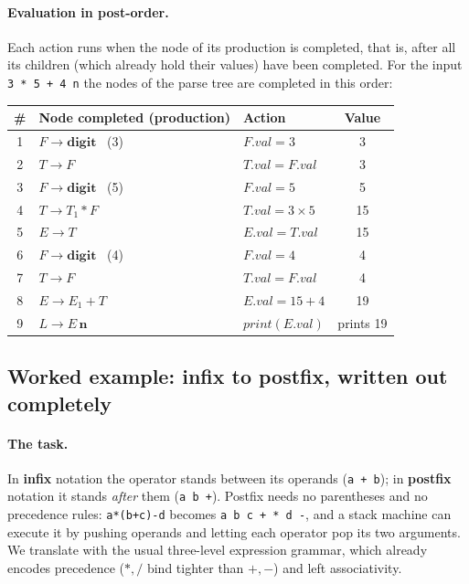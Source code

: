 \documentclass[11pt,a4paper]{article}
\begin{document}
\paragraph{Evaluation in post-order.} Each action runs when the node of its production is completed, that is, after all its children (which already hold their values) have been completed. For the input \texttt{3 * 5 + 4 n} the nodes of the parse tree are completed in this order:
\begin{center}
\small
\begin{tabular}{@{}c l l c@{}}
\toprule
\textbf{\#} & \textbf{Node completed (production)} & \textbf{Action} & \textbf{Value} \\ \midrule
1 & $F\to\mathbf{digit}$ \ (3) & $F.val=3$ & 3 \\
2 & $T\to F$ & $T.val=F.val$ & 3 \\
3 & $F\to\mathbf{digit}$ \ (5) & $F.val=5$ & 5 \\
4 & $T\to T_1*F$ & $T.val=3\times5$ & 15 \\
5 & $E\to T$ & $E.val=T.val$ & 15 \\
6 & $F\to\mathbf{digit}$ \ (4) & $F.val=4$ & 4 \\
7 & $T\to F$ & $T.val=F.val$ & 4 \\
8 & $E\to E_1+T$ & $E.val=15+4$ & 19 \\
9 & $L\to E\,\mathbf{n}$ & $\mathit{print}(E.val)$ & prints 19 \\ \bottomrule
\end{tabular}
\end{center}

\subsection{Worked example: infix to postfix, written out completely}
\label{sec:infix2postfix}

\paragraph{The task.} In \textbf{infix} notation the operator stands between its operands (\texttt{a + b}); in \textbf{postfix} notation it stands \emph{after} them (\texttt{a b +}). Postfix needs no parentheses and no precedence rules: \texttt{a*(b+c)-d} becomes \texttt{a b c + * d -}, and a stack machine can execute it by pushing operands and letting each operator pop its two arguments. We translate with the usual three-level expression grammar, which already encodes precedence ($*,/$ bind tighter than $+,-$) and left associativity.
\end{document}
